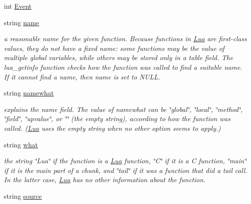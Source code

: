 \begin{DoxyCompactItemize}
\item 
int \hyperlink{struct_tao_1_1_lua_1_1_lua_1_1lua___debug_a3b330c9dd952e2724e3a87f50de08958}{Event}
\item 
string \hyperlink{struct_tao_1_1_lua_1_1_lua_1_1lua___debug_a9ef8232e37059b3726de4bb119892b12}{name}
\begin{DoxyCompactList}\small\item\em a reasonable name for the given function. Because functions in \hyperlink{namespace_tao_1_1_lua}{Lua} are first-\/class values, they do not have a fixed name: some functions may be the value of multiple global variables, while others may be stored only in a table field. The lua\_\-getinfo function checks how the function was called to find a suitable name. If it cannot find a name, then name is set to NULL. \item\end{DoxyCompactList}\item 
string \hyperlink{struct_tao_1_1_lua_1_1_lua_1_1lua___debug_ad3d4677c0ea662d4c9b74e19b4a167e3}{namewhat}
\begin{DoxyCompactList}\small\item\em explains the name field. The value of namewhat can be \char`\"{}global\char`\"{}, \char`\"{}local\char`\"{}, \char`\"{}method\char`\"{}, \char`\"{}field\char`\"{}, \char`\"{}upvalue\char`\"{}, or \char`\"{}\char`\"{} (the empty string), according to how the function was called. (\hyperlink{namespace_tao_1_1_lua}{Lua} uses the empty string when no other option seems to apply.) \item\end{DoxyCompactList}\item 
string \hyperlink{struct_tao_1_1_lua_1_1_lua_1_1lua___debug_a3b2695a6c96efd00e1b0039e27e8d878}{what}
\begin{DoxyCompactList}\small\item\em the string \char`\"{}Lua\char`\"{} if the function is a \hyperlink{namespace_tao_1_1_lua}{Lua} function, \char`\"{}C\char`\"{} if it is a C function, \char`\"{}main\char`\"{} if it is the main part of a chunk, and \char`\"{}tail\char`\"{} if it was a function that did a tail call. In the latter case, \hyperlink{namespace_tao_1_1_lua}{Lua} has no other information about the function. \item\end{DoxyCompactList}\item 
string \hyperlink{struct_tao_1_1_lua_1_1_lua_1_1lua___debug_a8682296e8b550c74a40db513c0b39d3c}{source}

\end{DoxyCompactItemize}
